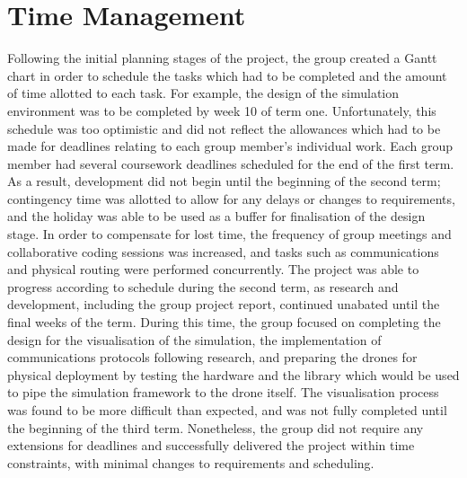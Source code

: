 	\section{Time Management}
Following the initial planning stages of the project, the group created a Gantt chart in order to schedule the tasks which had to be completed and the amount of time allotted to each task. For example, the design of the simulation environment was to be completed by week 10 of term one. Unfortunately, this schedule was too optimistic and did not reflect the allowances which had to be made for deadlines relating to each group member’s individual work. Each group member had several coursework deadlines scheduled for the end of the first term. As a result, development did not begin until the beginning of the second term; contingency time was allotted to allow for any delays or changes to requirements, and the holiday was able to be used as a buffer for finalisation of the design stage. In order to compensate for lost time, the frequency of group meetings and collaborative coding sessions was increased, and tasks such as communications and physical routing were performed concurrently.
The project was able to progress according to schedule during the second term, as research and development, including the group project report, continued unabated until the final weeks of the term. During this time, the group focused on completing the design for the visualisation of the simulation, the implementation of communications protocols following research, and preparing the drones for physical deployment by testing the hardware and the library which would be used to pipe the simulation framework to the drone itself. The visualisation process was found to be more difficult than expected, and was not fully completed until the beginning of the third term. Nonetheless, the group did not require any extensions for deadlines and successfully delivered the project within time constraints, with minimal changes to requirements and scheduling.
